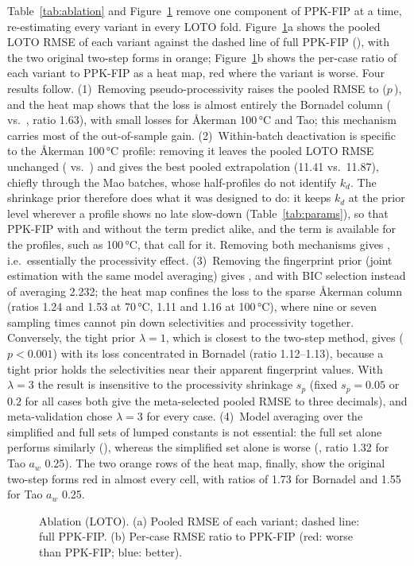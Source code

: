 Table~\ref{tab:ablation} and Figure~\ref{fig:ablation} remove one component of PPK-FIP at a time, re-estimating every variant in every LOTO fold. Figure~\ref{fig:ablation}a shows the pooled LOTO RMSE of each variant against the dashed line of full PPK-FIP (\LotoAllNew), with the two original two-step forms in orange; Figure~\ref{fig:ablation}b shows the per-case ratio of each variant to PPK-FIP as a heat map, red where the variant is worse. Four results follow. (1)~Removing pseudo-processivity raises the pooled RMSE to \AblNoProc{} ($p$\,\AblNoProcP), and the heat map shows that the loss is almost entirely the Bornadel column (\AblNoProcBorn{} vs.\ \LotoBornNew, ratio 1.63), with small losses for Åkerman 100\,°C and Tao; this mechanism carries most of the out-of-sample gain. (2)~Within-batch deactivation is specific to the Åkerman 100\,°C profile: removing it leaves the pooled LOTO RMSE unchanged (\AblNoKd{} vs.\ \LotoAllNew) and gives the best pooled extrapolation (11.41 vs.\ 11.87), chiefly through the Mao batches, whose half-profiles do not identify $k_d$. The shrinkage prior therefore does what it was designed to do: it keeps $k_d$ at the prior level wherever a profile shows no late slow-down (Table~\ref{tab:params}), so that PPK-FIP with and without the term predict alike, and the term is available for the profiles, such as 100\,°C, that call for it. Removing both mechanisms gives \AblNoBoth, i.e.\ essentially the processivity effect. (3)~Removing the fingerprint prior (joint estimation with the same model averaging) gives \AblJoint, and with BIC selection instead of averaging 2.232; the heat map confines the loss to the sparse Åkerman column (ratios 1.24 and 1.53 at 70\,°C, 1.11 and 1.16 at 100\,°C), where nine or seven sampling times cannot pin down selectivities and processivity together. Conversely, the tight prior $\lambda=1$, which is closest to the two-step method, gives \AblLamOne{} ($p<0.001$) with its loss concentrated in Bornadel (ratio 1.12--1.13), because a tight prior holds the selectivities near their apparent fingerprint values. With $\lambda=3$ the result is insensitive to the processivity shrinkage $s_p$ (fixed $s_p=0.05$ or $0.2$ for all cases both give the meta-selected pooled RMSE to three decimals), and meta-validation chose $\lambda=3$ for every case. (4)~Model averaging over the simplified and full sets of lumped constants is not essential: the full set alone performs similarly (\AblFullOnly), whereas the simplified set alone is worse (\AblSimplOnly, ratio 1.32 for Tao $a_w$ 0.25). The two orange rows of the heat map, finally, show the original two-step forms red in almost every cell, with ratios of 1.73 for Bornadel and 1.55 for Tao $a_w$ 0.25.
\begin{figure}[!htbp]\centering{}\caption{Ablation (LOTO). (a) Pooled RMSE of each variant; dashed line: full PPK-FIP. (b) Per-case RMSE ratio to PPK-FIP (red: worse than PPK-FIP; blue: better).}\label{fig:ablation}\end{figure}

